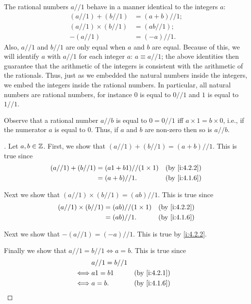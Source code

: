 \begin{ac}\label{i:ac:4.2.2}
  The rational numbers \(a // 1\) behave in a manner identical to the integers \(a\):
  \begin{align*}
    (a // 1) + (b // 1)      & = (a + b) // 1; \\
    (a // 1) \times (b // 1) & = (ab // 1);    \\
    -(a // 1)                & = (-a) // 1.
  \end{align*}
  Also, \(a // 1\) and \(b // 1\) are only equal when \(a\) and \(b\) are equal.
  Because of this, we will identify \(a\) with \(a // 1\) for each integer \(a\): \(a \equiv a // 1\);
  the above identities then guarantee that the arithmetic of the integers is consistent with the arithmetic of the rationals.
  Thus, just as we embedded the natural numbers inside the integers, we embed the integers inside the rational numbers.
  In particular, all natural numbers are rational numbers, for instance \(0\) is equal to \(0 // 1\) and \(1\) is equal to \(1 // 1\).

  Observe that a rational number \(a // b\) is equal to \(0 = 0 // 1\) iff \(a \times 1 = b \times 0\), i.e., if the numerator \(a\) is equal to \(0\).
  Thus, if \(a\) and \(b\) are non-zero then so is \(a // b\).
\end{ac}

\begin{proof}[]
  Let \(a, b \in \mathbb{Z}\).
  First, we show that \((a // 1) + (b // 1) = (a + b) // 1\).
  This is true since
  \begin{align*}
    (a // 1) + (b // 1) & = (a1 + b1) // (1 \times 1) &  & \by{i:4.2.2} \\
                        & = (a + b) // 1.             &  & \by{i:4.1.6}
  \end{align*}

  Next we show that \((a // 1) \times (b // 1) = (ab) // 1\).
  This is true since
  \begin{align*}
    (a // 1) \times (b // 1) & = (ab) // (1 \times 1) &  & \by{i:4.2.2} \\
                             & = (ab) // 1.           &  & \by{i:4.1.6}
  \end{align*}

  Next we show that \(-(a // 1) = (-a) // 1\).
  This is true by \cref{i:4.2.2}.

  Finally we show that \(a // 1 = b // 1 \iff a = b\).
  This is true since
  \begin{align*}
         & a // 1 = b // 1                   \\
    \iff & a1 = b1         &  & \by{i:4.2.1} \\
    \iff & a = b.          &  & \by{i:4.1.6}
  \end{align*}
\end{proof}

